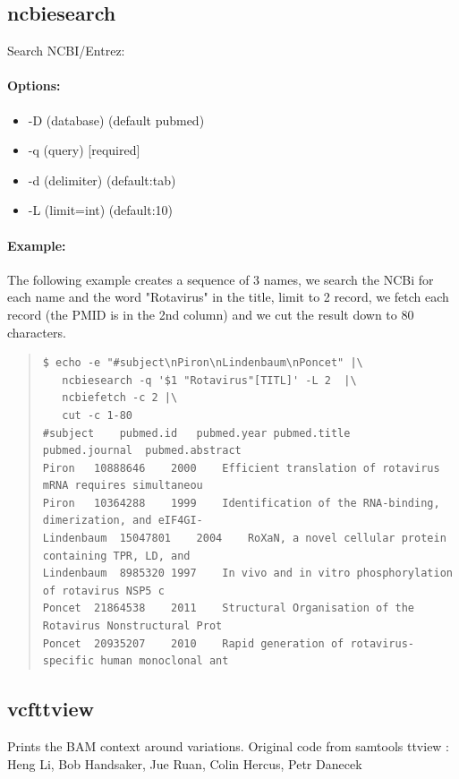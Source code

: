 \documentclass[12pt]{article}
\begin{document}
\subsection{ncbiesearch}
Search NCBI/Entrez:
\paragraph{Options:}
\begin{itemize}
\item-D (database) (default pubmed)
\item-q (query) [required]
\item-d (delimiter) (default:tab)
\item-L (limit=int) (default:10)
\end{itemize}
\paragraph{Example:}
The following example creates a sequence of 3 names, we search the NCBi for each name and the word "Rotavirus" in the title, limit to 2 record, we fetch each record (the PMID is in the 2nd column) and we cut the result down to 80 characters.
 
\begin{quote}
\begin{verbatim}
$ echo -e "#subject\nPiron\nLindenbaum\nPoncet" |\
   ncbiesearch -q '$1 "Rotavirus"[TITL]' -L 2  |\
   ncbiefetch -c 2 |\
   cut -c 1-80
#subject	pubmed.id	pubmed.year	pubmed.title	pubmed.journal	pubmed.abstract
Piron	10888646	2000	Efficient translation of rotavirus mRNA requires simultaneou
Piron	10364288	1999	Identification of the RNA-binding, dimerization, and eIF4GI-
Lindenbaum	15047801	2004	RoXaN, a novel cellular protein containing TPR, LD, and
Lindenbaum	8985320	1997	In vivo and in vitro phosphorylation of rotavirus NSP5 c
Poncet	21864538	2011	Structural Organisation of the Rotavirus Nonstructural Prot
Poncet	20935207	2010	Rapid generation of rotavirus-specific human monoclonal ant
\end{verbatim}
\end{quote}



\subsection{vcfttview}
Prints the BAM context around variations.
Original code from samtools ttview : Heng Li, Bob Handsaker, Jue Ruan, Colin Hercus, Petr Danecek
\end{document}
